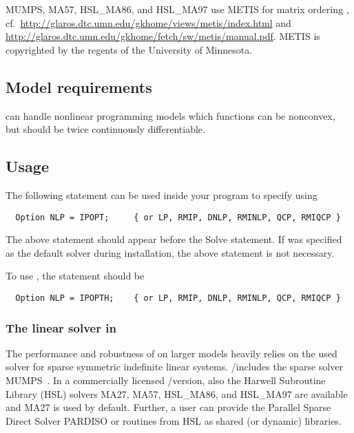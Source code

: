 \textsc{MUMPS}, \textsc{MA57}, \textsc{HSL\_MA86}, and \textsc{HSL\_MA97} use \textsc{METIS} for matrix ordering \cite{KaKu99}, cf.~\url{http://glaros.dtc.umn.edu/gkhome/views/metis/index.html} and \url{http://glaros.dtc.umn.edu/gkhome/fetch/sw/metis/manual.pdf}.
\textsc{METIS} is copyrighted by the regents of the University of Minnesota.

\subsection{Model requirements}

\IPOPT can handle nonlinear programming models which functions can be nonconvex, but should be twice continuously differentiable.

\subsection{Usage}

The following statement can be used inside your \GAMS program to specify using \IPOPT
\begin{verbatim}
  Option NLP = IPOPT;     { or LP, RMIP, DNLP, RMINLP, QCP, RMIQCP }
\end{verbatim}

The above statement should appear before the Solve statement.
If \IPOPT was specified as the default solver during \GAMS installation, the above statement is not necessary.

To use \IPOPTH, the statement should be
\begin{verbatim}
  Option NLP = IPOPTH;    { or LP, RMIP, DNLP, RMINLP, QCP, RMIQCP }
\end{verbatim}

\subsubsection{The linear solver in \IPOPT}
\label{ipoptlinearsolver}
\hypertarget{ipoptlinearsolver}{}

The performance and robustness of \IPOPT on larger models heavily relies on the used solver for sparse symmetric indefinite linear systems.
\GAMS/\IPOPT includes the sparse solver MUMPS~\cite{AmestoyDuffKosterLExcellent2001,AmestoyGuermoucheLExcellentPralet2006}.
In a commercially licensed \GAMS/\IPOPTH version, also the Harwell Subroutine Library (HSL) solvers \textsc{MA27}, \textsc{MA57}, \textsc{HSL\_MA86}, and \textsc{HSL\_MA97} are available and MA27 is used by default.
Further, a user can provide the Parallel Sparse Direct Solver PARDISO or routines from HSL as shared (or dynamic) libraries.

